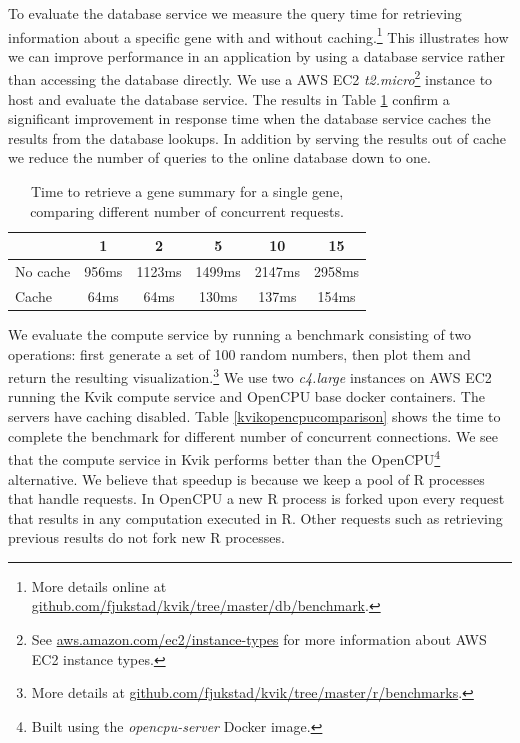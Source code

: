 To evaluate the database service we measure the query time for retrieving
information about a specific gene with and without caching.\footnote{More
details online at \url{github.com/fjukstad/kvik/tree/master/db/benchmark}.} This
illustrates how we can improve performance in an application by using a database
service rather than accessing the database directly. 
We use a AWS EC2 \emph{t2.micro}\footnote{See
\url{aws.amazon.com/ec2/instance-types} for more information about AWS EC2
instance types.} instance to host and evaluate the database service.  The
results in Table \ref{db} confirm a significant improvement in response time
when the database service caches the results from the database lookups. In
addition by serving the results out of cache we reduce the number of queries to
the online database down to one. 

\begin{table}[h]
    \caption[]{Time to retrieve a gene summary for a single gene, comparing
    different number of concurrent requests.}
    \begin{tabular}{| l | c | c | c | c | c | }
        \hline 
        & 1 & 2 & 5 & 10 & 15 \\ 
      \hline			
      No cache & 956ms & 1123ms & 1499ms & 2147ms & 2958ms\\
      \hline
      Cache & 64ms & 64ms & 130ms & 137ms & 154ms\\
      \hline  
    \end{tabular}
\label{db}
\end{table} 

We evaluate the compute service by running a benchmark consisting of two
operations: first generate a set of 100 random numbers, then plot them and
return the resulting visualization.\footnote{More details at
\url{github.com/fjukstad/kvik/tree/master/r/benchmarks}.} We use two
\emph{c4.large} instances on AWS EC2 running the Kvik compute service and
OpenCPU base docker containers. The servers have caching disabled.  
Table \ref{kvikopencpucomparison} shows the time to complete the benchmark for
different number of concurrent connections. We see that the compute service in
Kvik performs better than the OpenCPU\footnote{Built using the
\textit{opencpu-server} Docker image.} alternative. We believe that speedup is
because we keep a pool of R processes that handle requests. In OpenCPU a new R
process is forked upon every request that results in any computation executed in
R. Other requests such as retrieving previous results do not fork new R
processes. 

